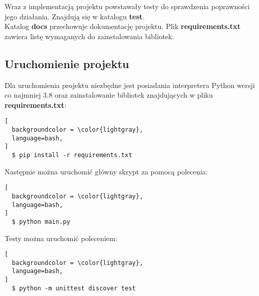 \documentclass[12pt,a4paper]{article}
\begin{document}
Wraz z implementacją projektu powstawały testy do sprawdzenia poprawności
jego działania. Znajdują się w katalogu \textbf{test}. \\

Katalog \textbf{docs} przechowuje dokumentację projektu.
Plik \textbf{requirements.txt} zawiera listę wymaganych do zainstalowania
bibliotek.

\subsection{Uruchomienie projektu}

Dla uruchomienia projektu niezbędne jest posiadania interpretera Python wersji co najmniej 3.8
oraz zainstalowanie bibliotek znajdujących w pliku \textbf{requirements.txt}:

\begin{lstlisting}[
  backgroundcolor = \color{lightgray},
  language=bash,
]
  $ pip install -r requirements.txt
\end{lstlisting}

\bigskip

Następnie można uruchomić główny skrypt za pomocą polecenia:

\begin{lstlisting}[
  backgroundcolor = \color{lightgray},
  language=bash,
]
  $ python main.py
\end{lstlisting}

Testy można uruchomić poleceniem:

\begin{lstlisting}[
  backgroundcolor = \color{lightgray},
  language=bash,
]
  $ python -m unittest discover test
\end{lstlisting}

\end{document}
